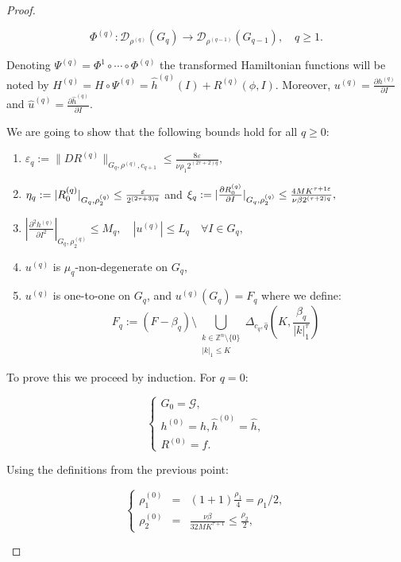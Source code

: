 \begin{proof}
\begin{enumerate}
$$\Phi^{(q)}:\mathcal{D}_{\rho^{(q)}}(G_q) \rightarrow \mathcal{D}_{\rho^{(q-1)}}(G_{q-1}), \quad q \geq 1.$$

Denoting $\Psi^{(q)}= \Phi^{1}\circ \cdots \circ \Phi^{(q)}$ the transformed Hamiltonian functions will be noted by $H^{(q)} = H\circ \Psi^{(q)} = \hat h^{(q)}(I) + R^{(q)}(\phi,I)$. Moreover, $u^{(q)} = \frac{\partial h^{(q)}}{\partial I}$ and $\hat u^{(q)} = \frac{\partial \hat h^{(q)}}{\partial I}$.

We are going to show that the following bounds hold for all $q \geq 0$:

\begin{enumerate}
\item\label{eq:induction1} $\varepsilon_q := \|DR^{(q)}\|_{G_q,\rho^{(q)},c_{q+1}} \leq \frac{8\varepsilon}{\nu \rho_1 2^{(2\tau+2)q}},$
\item\label{eq:induction2} $\eta_q:=|R_0^{(q)}|_{G_q,\rho_2^{(q)}} \leq \textcolor{black}{\frac{\varepsilon}{2^{(2\tau+3)q}}}$ and $\xi_q:=|\frac{\partial R_0^{(q)}}{\partial I}|_{G_q,\rho_2^{(q)}} \leq \textcolor{black}{ \frac{4 M K^{\tau+1 \varepsilon}}{\nu \beta 2^{(\tau+2)q}}},$
\item\label{eq:induction3} $|\frac{\partial^2 h^{(q)}}{\partial I^2}|_{G_q,\rho_2^{(q)}}\leq M_q, \quad |u^{(q)}| \leq L_q \quad \forall I\in G_q,$
\item\label{eq:induction4} $u^{(q)}$ is $\mu_q$-non-degenerate on $G_q$,
\item\label{eq:induction5} $u^{(q)}$ is one-to-one on $G_q$, and $u^{(q)}(G_q)=F_q$ where we define:
$$F_q := (F - \beta_q)\setminus \bigcup_{\substack{k\in\mathbb{Z}^n\setminus\{0\} \\ |k|_1 \leq K}} \Delta_{c_q,\hat q}(K,\frac{\beta_q}{|k|_1^\tau})$$
\end{enumerate}

To prove this we proceed by induction. For $q = 0$:

$$
\left\{
\begin{array}{l}
G_0 = \mathcal{G}, \\
h^{(0)} = h,\hat h^{(0)} = \hat h,\\
R^{(0)} = f.
\end{array}
\right.
$$

Using the definitions from the previous point:

$$
\left\{
\begin{array}{rcl}
\rho_1^{(0)} &=& (1+1)\frac{\rho_1}{4} = \rho_1/2,\\
\rho_2^{(0)} &=& \frac{\nu \beta}{32 M K^{\tau+1}} \leq \frac{\rho_2}{2},
\end{array}
\right.
$$


\end{enumerate}
\end{proof}
